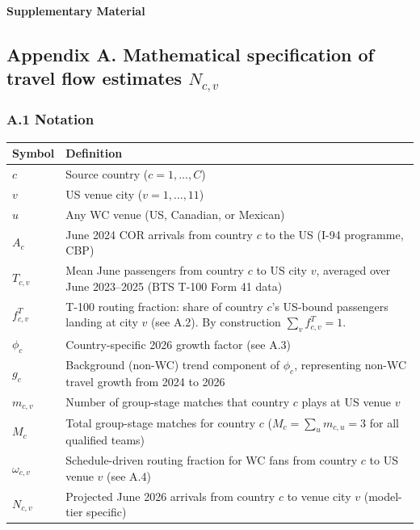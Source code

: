 \documentclass[12pt, a4paper]{article}
\newcounter{suppfig}
\begin{document}



\newpage

\begin{center}
{\large\bfseries Supplementary Material}
\end{center}

\setcounter{suppfig}{0}

\subsection*{Appendix A. Mathematical specification of travel flow
estimates $N_{c,v}$}

\subsubsection*{A.1 Notation}

\begin{center}
\small
\begin{tabular}{p{2.2cm} p{10cm}}
\toprule
\textbf{Symbol} & \textbf{Definition} \\
\midrule
$c$ & Source country ($c = 1,\ldots,C$) \\
$v$ & US venue city ($v = 1,\ldots,11$) \\
$u$ & Any WC venue (US, Canadian, or Mexican) \\
$A_c$ & June 2024 COR arrivals from country $c$ to the US
        (I-94 programme, CBP) \\
$T_{c,v}$ & Mean June passengers from country $c$ to US city $v$,
        averaged over June 2023--2025 (BTS T-100 Form 41 data) \\
$f_{c,v}^{T}$ & T-100 routing fraction: share of country $c$'s
        US-bound passengers landing at city $v$ (see A.2).
        By construction $\sum_{v} f_{c,v}^{T} = 1$. \\
$\phi_c$ & Country-specific 2026 growth factor (see A.3) \\
$g_c$ & Background (non-WC) trend component of $\phi_c$,
        representing non-WC travel growth from 2024 to 2026 \\
$m_{c,v}$ & Number of group-stage matches that country $c$
        plays at US venue $v$ \\
$M_c$ & Total group-stage matches for country $c$
        ($M_c = \sum_u m_{c,u} = 3$ for all qualified teams) \\
$\omega_{c,v}$ & Schedule-driven routing fraction for WC fans
        from country $c$ to US venue $v$ (see A.4) \\
$N_{c,v}$ & Projected June 2026 arrivals from country $c$
        to venue city $v$ (model-tier specific) \\
\bottomrule
\end{tabular}
\end{center}
\end{document}
